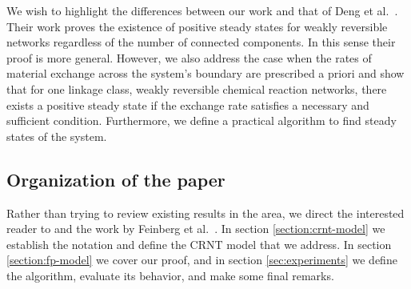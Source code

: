 \documentclass[smallextended]{svjour3}       %
\newcounter{sent}
\newcommand*{\0}{\mathbf{0}}
\newcommand*{\1}{\mathbf{1}}
\newcommand*{\R}{\mathbbm{R}}
\begin{document}
We wish to highlight the differences between our work and that of Deng et al.\ 
\cite{Deng}. Their work proves the existence of positive steady states for 
weakly reversible networks regardless of the number of connected components.
In this sense their proof is more general. However, we
also address the case when the rates of material exchange across the system's 
boundary are prescribed a priori and show that for one linkage class, weakly 
reversible chemical reaction networks, there exists a positive steady state if
the exchange rate satisfies a necessary and sufficient condition. Furthermore, we 
define a practical algorithm to find steady states of the system.

\subsection{Organization of the paper}

Rather than trying to review existing results in the area, we direct the 
interested reader to \cite{gunawardena,GMAK} and the work by Feinberg et al.\ 
\cite{deficiency0,deficiency1}. In section \ref{section:crnt-model} we establish
the notation and define the CRNT model that we address. In section
\ref{section:fp-model} we cover our proof, and in section \ref{sec:experiments}
we define the algorithm, evaluate its behavior, and make some final remarks.

%
%
\end{document}
